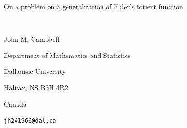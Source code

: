 \documentclass[12pt]{article}
\begin{document}
\begin{center}
{\large On a problem on a generalization of Euler's totient function}

 \ 
 
{\sc John M. Campbell}

\vspace{0.1in}

{\footnotesize Department of Mathematics and Statistics}

{\footnotesize Dalhousie University}

{\footnotesize Halifax, NS B3H 4R2}

{\footnotesize Canada}

\vspace{0.1in}

{\footnotesize {\tt jh241966@dal.ca}}

\vspace{0.1in}

\end{center}

\begin{abstract}
 B\"uy\"uka\c sik et al.\ [Publ.\ Math.\ Debrecen, 2024] introduced a family of generalizations of Euler's totient function $\varphi(n)$, by 
 setting $\varphi_k(n) = \sum_{a} a^k$ for $a \in [1, n]$ such that $(a, n) = 1$, with $\varphi_0(n) = \varphi(n)$. Letting $\mathcal{D}_{s} = 
 \{ k \geq s : \forall n \geq 1 \ \varphi_s(n) \mid \varphi_k(n) \}$, B\"uy\"uka\c sik et al.\ proved that $\mathcal{D}_{s}$ is finite for each 
 $s \geq 0$, and conjectured that $\mathcal{D}_{1} = \{ 1, 3, 15 \}$ and provided computations to support this conjecture. 
 We succeed in proving this conjecture, using an argument based on our extensive interactions with GPT-5.5 Pro. 
\end{abstract}

\vspace{0.1in}


\vspace{0.1in}

\end{document}

